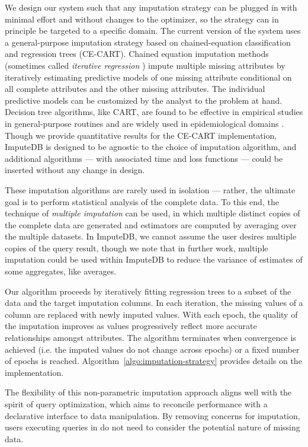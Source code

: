 We design our system such that any imputation strategy can be plugged in with minimal effort
and without changes to the optimizer, so the strategy can in principle be targeted to a
specific domain. The current version of the system uses a general-purpose imputation
strategy based on chained-equation classification and regression trees (CE-CART). Chained
equation imputation methods \cite{vanbuuren2011mice} (sometimes called \textit{iterative
regression} \cite{gelman2006data}) impute multiple missing attributes by
iteratively estimating predictive models of one missing attribute conditional on all
complete attributes and the other missing attributes. The individual predictive models can
be customized by the analyst to the problem at hand. Decision tree algorithms, like CART,
are found to be effective \cite{akande2015empirical} in empirical studies in general-purpose
routines and are widely used in epidemiological domains \cite{burgette2010multiple}. Though
we provide quantitative results for the CE-CART implementation, ImputeDB is designed to be
agnostic to the choice of imputation algorithm, and additional algorithms --- with
associated time and loss functions --- could be inserted without any change in design.

These imputation algorithms are rarely used in isolation --- rather, the ultimate goal is to
perform statistical analysis of the complete data. To this end, the technique of
\textit{multiple imputation} can be used, in which multiple distinct copies of the complete
data are generated and estimators are computed by averaging over the multiple datasets. In
ImputeDB, we cannot assume the user desires multiple copies of the query result, though we
note that in further work, multiple imputation could be used within ImputeDB to reduce the
variance of estimates of some aggregates, like averages.

Our algorithm proceeds by iteratively fitting regression trees to a subset of the data and
the target imputation columns. In each iteration, the missing values of a column are
replaced with newly imputed values. With each epoch, the quality of the imputation improves
as values progressively reflect more accurate relationships amongst attributes. The
algorithm terminates when convergence is achieved (i.e. the imputed values do not change across
epochs) or a fixed number of epochs is reached.  Algorithm~\ref{algo:imputation-strategy}
provides details on the implementation.  

The flexibility of this non-parametric imputation approach aligns well with the spirit of
query optimization, which aims to reconcile performance with a declarative interface to data
manipulation. By removing concerns for imputation, users executing queries in \ProjectName{}
do not need to consider the potential nature of missing data.

